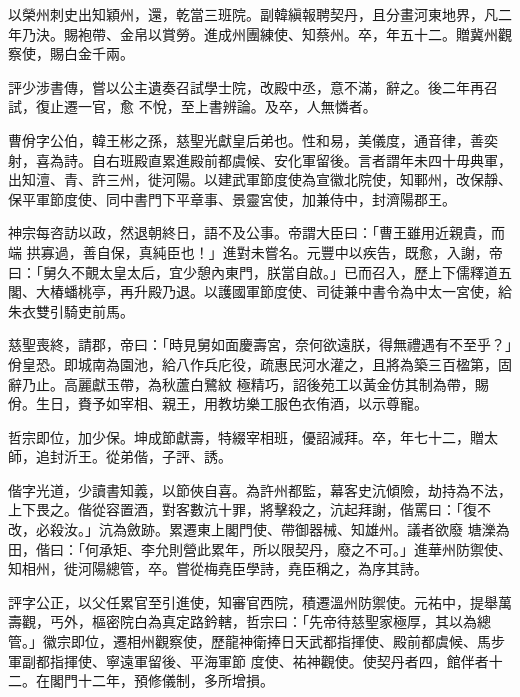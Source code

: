 \begin{pinyinscope}
 以榮州刺史出知穎州，還，乾當三班院。副韓縝報聘契丹，且分畫河東地界，凡二年乃決。賜袍帶、金帛以賞勞。進成州團練使、知蔡州。卒，年五十二。贈冀州觀察使，賜白金千兩。



 評少涉書傳，嘗以公主遺奏召試學士院，改殿中丞，意不滿，辭之。後二年再召試，復止遷一官，愈
 不悅，至上書辨論。及卒，人無憐者。



 曹佾字公伯，韓王彬之孫，慈聖光獻皇后弟也。性和易，美儀度，通音律，善奕射，喜為詩。自右班殿直累進殿前都虞候、安化軍留後。言者謂年未四十毋典軍，出知澶、青、許三州，徙河陽。以建武軍節度使為宣徽北院使，知鄆州，改保靜、保平軍節度使、同中書門下平章事、景靈宮使，加兼侍中，封濟陽郡王。



 神宗每咨訪以政，然退朝終日，語不及公事。帝謂大臣曰：「曹王雖用近親貴，而端
 拱寡過，善自保，真純臣也！」進對未嘗名。元豐中以疾告，既愈，入謝，帝曰：「舅久不覿太皇太后，宜少憩內東門，朕當自啟。」已而召入，歷上下儒釋道五閣、大椿蟠桃亭，再升殿乃退。以護國軍節度使、司徒兼中書令為中太一宮使，給朱衣雙引騎吏前馬。



 慈聖喪終，請郡，帝曰：「時見舅如面慶壽宮，奈何欲遠朕，得無禮遇有不至乎？」佾皇恐。即城南為園池，給八作兵庀役，疏惠民河水灌之，且將為築三百楹第，固辭乃止。高麗獻玉帶，為秋蘆白鷺紋
 極精巧，詔後苑工以黃金仿其制為帶，賜佾。生日，賚予如宰相、親王，用教坊樂工服色衣侑酒，以示尊寵。



 哲宗即位，加少保。坤成節獻壽，特綴宰相班，優詔減拜。卒，年七十二，贈太師，追封沂王。從弟偕，子評、誘。



 偕字光道，少讀書知義，以節俠自喜。為許州都監，幕客史沆傾險，劫持為不法，上下畏之。偕從容置酒，對客數沆十罪，將擊殺之，沆起拜謝，偕罵曰：「復不改，必殺汝。」沆為斂跡。累遷東上閣門使、帶御器械、知雄州。議者欲廢
 塘濼為田，偕曰：「何承矩、李允則營此累年，所以限契丹，廢之不可。」進華州防禦使、知相州，徙河陽總管，卒。嘗從梅堯臣學詩，堯臣稱之，為序其詩。



 評字公正，以父任累官至引進使，知審官西院，積遷溫州防禦使。元祐中，提舉萬壽觀，丐外，樞密院白為真定路鈐轄，哲宗曰：「先帝待慈聖家極厚，其以為總管。」徽宗即位，遷相州觀察使，歷龍神衛捧日天武都指揮使、殿前都虞候、馬步軍副都指揮使、寧遠軍留後、平海軍節
 度使、祐神觀使。使契丹者四，館伴者十二。在閣門十二年，預修儀制，多所增損。




\end{pinyinscope}
